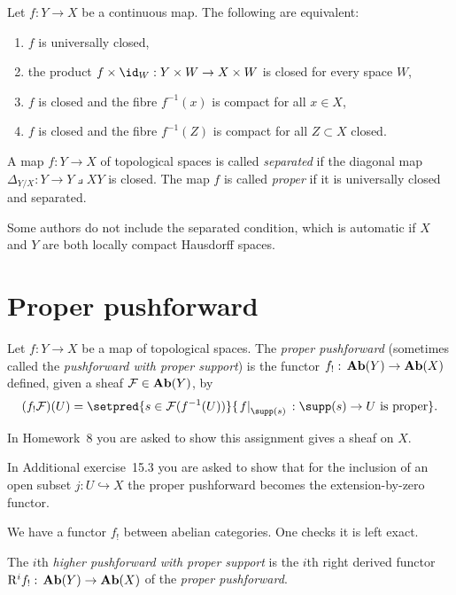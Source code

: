 \begin{prop}
	Let $f\colon Y \to X$ be a continuous map. The following are equivalent:
	\begin{enumerate}
    	\item $f$ is universally closed,
		\item the product $f \times \id_W\colon Y \times W \to X \times W$ is closed for every space \(W\),
		\item $f$ is closed and the fibre $f^{-1}(x)$ is compact for all $x \in X$,
		\item $f$ is closed and the fibre $f^{-1}(Z)$ is compact for all $Z \subset X$ closed.
    \end{enumerate}
\end{prop}

\begin{defn}
	A map $f\colon Y \to X$ of topological spaces is called \emph{separated} if the diagonal map $
    	\Delta_{Y/X}\colon Y \to Y\pullback{X} Y
    $ is closed. The map $f$ is called \emph{proper} if it is universally closed and separated.
\end{defn}
\begin{rmk}
	Some authors do not include the separated condition, which is automatic if $X$ and $Y$ are both locally compact Hausdorff spaces.
\end{rmk}

\section{Proper pushforward}

\begin{defn}
	Let $f\colon Y \to X$ be a map of topological spaces. The \emph{proper pushforward} (sometimes called the \emph{pushforward with proper support}) is the functor $f_{!}\colon \catAbelianSheaf(Y) \to \catAbelianSheaf(X)$ defined, given a sheaf $\mathcal{F} \in \operatorname{\mathbf{Ab}}(Y)$, by \[
		(f_{!}\sh{F})(U) = \setpred{s \in \sh{F}(f^{-1}(U))}{\restr{f}{\supp(s)}\colon \supp(s) \to U \text{ is proper}}\text{.}
    \]
\end{defn}
\begin{rmk}
	In Homework~8 you are asked to show this assignment gives a sheaf on $X$.
\end{rmk}
\begin{exmp}
	In Additional exercise~15.3 you are asked to show that for the inclusion of an open subset $j\colon U \hookrightarrow X$ the proper pushforward becomes the extension-by-zero functor.
\end{exmp}
We have a functor $f_!$ between abelian categories. One checks it is left exact.
\begin{defn}
	The $i$th \emph{higher pushforward with proper support} is the \(i\)th right derived functor $\rightderived^if_!\colon \catAbelianSheaf(Y) \to \catAbelianSheaf(X)$ of the \emph{proper pushforward}.
\end{defn}

